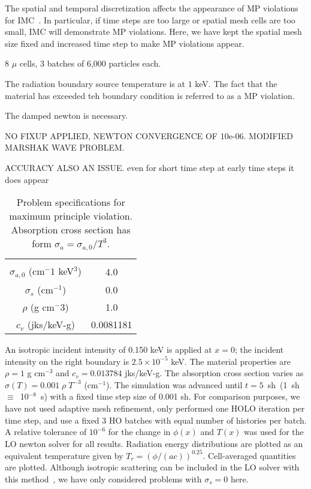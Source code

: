 The spatial and temporal discretization affects the appearance of MP violations for
IMC~\cite{wollaber2013discrete}. In particular, if time steps are too large or spatial
mesh cells are too small, IMC will demonstrate MP violations.  Here, we have kept the
spatial mesh size fixed and increased time step to make MP violations appear.

8 $\mu$ cells, 3 batches of 6,000 particles each.

The radiation boundary source temperature is at $1$ keV. The fact that the material
has exceeded teh boundary condition is referred to as a MP violation.


The damped newton is necessary.

NO FIXUP APPLIED, NEWTON CONVERGENCE OF 10e-06.  MODIFIED MARSHAK WAVE PROBLEM.

ACCURACY ALSO AN ISSUE.  even for short time step at early time steps it does appear

\begin{table}[H]
        \caption{\label{tab:mpv_prob}Problem specifications for maximum principle
        violation. Absorption cross section has form $\sigma_a = \sigma_{a,0}/T^3$.}
\centering
        \begin{tabular}{|c|c|} \hline \\
            $\sigma_{a,0}$ (cm$^-1$ keV$^3$)  & 4.0  \\
            $\sigma_s$ (cm$^{-1}$) & 0.0 \\
            $\rho$ (g cm$^-3$) & 1.0  \\
            $c_v$ (jks/keV-g) & 0.0081181  \\ 
        \end{tabular}
\end{table}



   An isotropic incident intensity of 0.150 keV is applied
at $x=0$; the incident intensity on the right boundary is $2.5\times10^{-5}$ keV.
The material properties are $\rho = 1$ g cm$^{-3}$ and $c_v = 0.013784$ jks/keV-g. The
absorption cross section varies as $\sigma(T) = 0.001\;\rho\; T^{-3}$ (cm$^{-1}$).
The simulation was advanced until $t=5$~sh~(1~sh~$\equiv$~10$^{-8}$~s) with a fixed time step size of 0.001 sh. For comparison purposes, we
have not used adaptive mesh
refinement, only performed one HOLO iteration per time
step, and use a fixed 3 HO batches with equal number of histories per batch. A
relative tolerance of $10^{-6}$ for the change in $\phi(x)$ and $T(x)$ was used for
the LO newton solver for all results. Radiation energy
distributions are plotted as an equivalent temperature given by
$T_r=(\phi/(ac))^{0.25}$.  Cell-averaged quantities are plotted.
Although isotropic scattering can be included in the LO solver with this method~\cite{ans_2014}, we have only
considered problems with $\sigma_s = 0$ here.  
